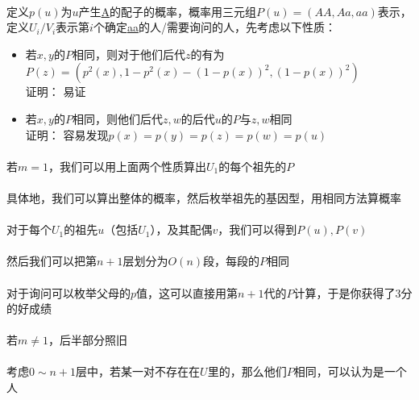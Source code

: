 \documentclass[UTF8]{ctexart}
\begin{document}
\paragraph{}定义$p(u)$为$u$产生\underline{A}的配子的概率，概率用三元组$P(u)=(AA,Aa,aa)$表示，定义$U_i/V_i$表示第$i$个确定\underline{aa}的人/需要询问的人，先考虑以下性质：

\begin{itemize}
	\item 若$x,y$的$P$相同，则对于他们后代$z$的有为$P(z)=(p^2(x),1-p^2(x)-(1-p(x))^2,(1-p(x))^2)$\\
	      证明： 易证
	\item 若$x,y$的$P$相同，则他们后代$z,w$的后代$u$的$P$与$z,w$相同\\
	      证明： 容易发现$p(x)=p(y)=p(z)=p(w)=p(u)$
\end{itemize}

\paragraph{}若$m=1$，我们可以用上面两个性质算出$U_1$的每个祖先的$P$

\paragraph{}具体地，我们可以算出整体的概率，然后枚举祖先的基因型，用相同方法算概率

\paragraph{}对于每个$U_1$的祖先$u$（包括$U_1$），及其配偶$v$，我们可以得到$P(u),P(v)$

\paragraph{}然后我们可以把第$n+1$层划分为$O(n)$段，每段的$P$相同

\paragraph{}对于询问可以枚举父母的$p$值，这可以直接用第$n+1$代的$P$计算，于是你获得了$3$分的好成绩

\paragraph{}若$m\not=1$，后半部分照旧

\paragraph{}考虑$0\sim n+1$层中，若某一对不存在在$U$里的，那么他们$P$相同，可以认为是一个人
\end{document}
